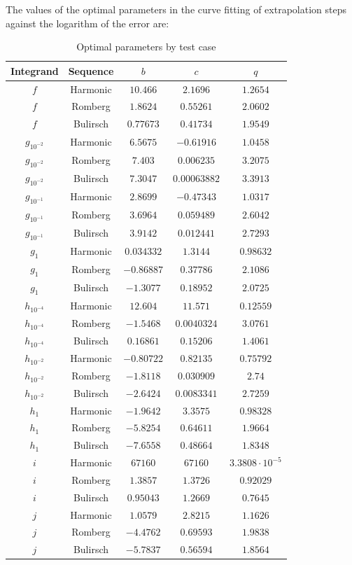 The values of the optimal parameters in the curve fitting of extrapolation steps against the logarithm of the error are:

\begin{table}[H]
    \centering
    \begin{tabular}{c|c||c|c|c}
        Integrand & Sequence & \(b\) & \(c\) & \(q\) \\\hline\hline
$f$ & Harmonic & \(10.466\) & \(2.1696\) & \(1.2654\)\\
$f$ & Romberg & \(1.8624\) & \(0.55261\) & \(2.0602\)\\
$f$ & Bulirsch & \(0.77673\) & \(0.41734\) & \(1.9549\)\\
$g_{10^{-2}}$ & Harmonic & \(6.5675\) & \(-0.61916\) & \(1.0458\)\\
$g_{10^{-2}}$ & Romberg & \(7.403\) & \(0.006235\) & \(3.2075\)\\
$g_{10^{-2}}$ & Bulirsch & \(7.3047\) & \(0.00063882\) & \(3.3913\) \\
$g_{10^{-1}}$ & Harmonic & \(2.8699\) & \(-0.47343\) & \(1.0317\) \\
$g_{10^{-1}}$ & Romberg & \(3.6964\) & \(0.059489\) & \(2.6042\) \\
$g_{10^{-1}}$ & Bulirsch & \(3.9142\) & \(0.012441\) & \(2.7293\)\\
$g_1$ & Harmonic & \(0.034332\) & \(1.3144\) & \(0.98632\) \\
$g_1$ & Romberg & \(-0.86887\) & \(0.37786\) & \(2.1086\)\\
$g_1$ & Bulirsch & \(-1.3077\) & \(0.18952\) & \(2.0725\)\\
$h_{10^{-4}}$ & Harmonic & \(12.604\) & \(11.571\) & \(0.12559\)\\
$h_{10^{-4}}$ & Romberg & \(-1.5468\) & \(0.0040324\) & \(3.0761\)\\
$h_{10^{-4}}$ & Bulirsch & \(0.16861\) & \(0.15206\) & \(1.4061\)\\
$h_{10^{-2}}$ & Harmonic & \(-0.80722\) & \(0.82135\) & \(0.75792\) \\
$h_{10^{-2}}$ & Romberg & \(-1.8118\) & \(0.030909\) & \(2.74\)\\
$h_{10^{-2}}$ & Bulirsch & \(-2.6424\) & \(0.0083341\) & \(2.7259\)\\
$h_1$ & Harmonic & \(-1.9642\) & \(3.3575\) & \(0.98328\)\\
$h_1$ & Romberg & \(-5.8254\) & \(0.64611\) & \(1.9664\)\\
$h_1$ & Bulirsch & \(-7.6558\) & \(0.48664\) & \(1.8348\)\\
$i$ & Harmonic & \(67160\) & \(67160\) & \(3.3808\cdot 10^{-5}\)\\
$i$ & Romberg & \(1.3857\) & \(1.3726\) & \(0.92029\)\\
$i$ & Bulirsch & \(0.95043\) & \(1.2669\) & \(0.7645\) \\
$j$ & Harmonic & \(1.0579\) & \(2.8215\) & \(1.1626\)\\
$j$ & Romberg & \(-4.4762\) & \(0.69593\) & \(1.9838\)\\
$j$ & Bulirsch & \(-5.7837\) & \(0.56594\) & \(1.8564\)\\
    \end{tabular}
    \caption{Optimal parameters by test case}
    \label{tab:my_label}
\end{table}